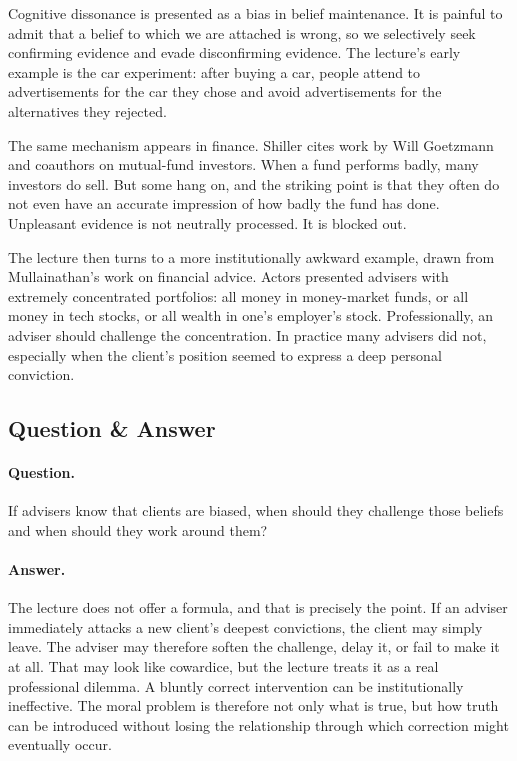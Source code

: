 Cognitive dissonance is presented as a bias in belief maintenance. It is painful to admit that a belief to which we are attached is wrong, so we selectively seek confirming evidence and evade disconfirming evidence. The lecture's early example is the car experiment: after buying a car, people attend to advertisements for the car they chose and avoid advertisements for the alternatives they rejected.

The same mechanism appears in finance. Shiller cites work by Will Goetzmann and coauthors on mutual-fund investors. When a fund performs badly, many investors do sell. But some hang on, and the striking point is that they often do not even have an accurate impression of how badly the fund has done. Unpleasant evidence is not neutrally processed. It is blocked out.

The lecture then turns to a more institutionally awkward example, drawn from Mullainathan's work on financial advice. Actors presented advisers with extremely concentrated portfolios: all money in money-market funds, or all money in tech stocks, or all wealth in one's employer's stock. Professionally, an adviser should challenge the concentration. In practice many advisers did not, especially when the client's position seemed to express a deep personal conviction.

\subsection{Question \& Answer}

\paragraph{Question.} If advisers know that clients are biased, when should they challenge those beliefs and when should they work around them?

\paragraph{Answer.} The lecture does not offer a formula, and that is precisely the point. If an adviser immediately attacks a new client's deepest convictions, the client may simply leave. The adviser may therefore soften the challenge, delay it, or fail to make it at all. That may look like cowardice, but the lecture treats it as a real professional dilemma. A bluntly correct intervention can be institutionally ineffective. The moral problem is therefore not only what is true, but how truth can be introduced without losing the relationship through which correction might eventually occur.

